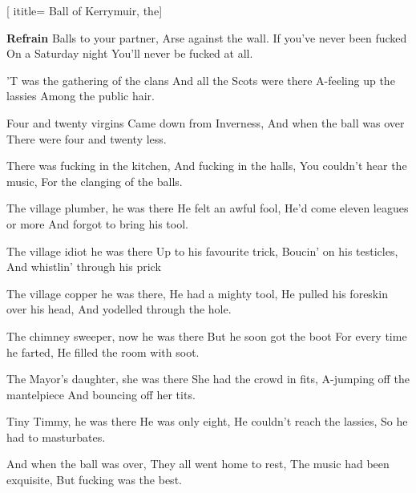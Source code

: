  [
ititle= {Ball of Kerrymuir, the}]

\beginchorus
\textbf {Refrain}
Balls to your partner,
Arse against the wall.
If you’ve never been fucked
On a Saturday night
You’ll never be fucked at all.
\endchorus

\beginverse
’T was the gathering of the clans
And all the Scots were there
A-feeling up the lassies
Among the public hair.
\endverse

\beginverse
Four and twenty virgins
Came down from Inverness,
And when the ball was over
There were four and twenty less.
\endverse

\beginverse
There was fucking in the kitchen,
And fucking in the halls,
You couldn’t hear the music,
For the clanging of the balls.
\endverse

\beginverse
The village plumber, he was there
He felt an awful fool,
He’d come eleven leagues or more
And forgot to bring his tool.
\endverse

\beginverse
The village idiot he was there
Up to his favourite trick,
Boucin’ on his testicles,
And whistlin’ through his prick
\endverse

\beginverse
The village copper he was there,
He had a mighty tool,
He pulled his foreskin over his head,
And yodelled through the hole.
\endverse

\beginverse
The chimney sweeper, now he was there
But he soon got the boot
For every time he farted,
He filled the room with soot.
\endverse

\beginverse
The Mayor’s daughter, she was there
She had the crowd in fits,
A-jumping off the mantelpiece
And bouncing off her tits.
\endverse

\beginverse
Tiny Timmy, he was there
He was only eight,
He couldn’t reach the lassies,
So he had to masturbates.
\endverse

\beginverse
And when the ball was over,
They all went home to rest,
The music had been exquisite,
But fucking was the best.
\endverse

\endsong